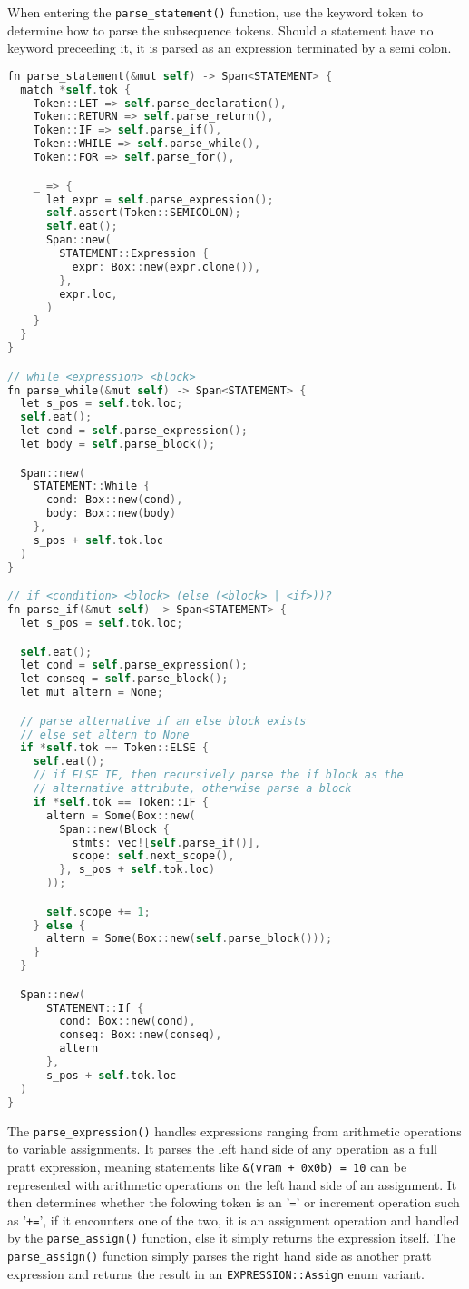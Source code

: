 When entering the \texttt{parse\_statement()} function, use the keyword token to determine how to parse the subsequence tokens. Should a statement have no keyword preceeding it, it is parsed as an expression terminated by a semi colon. 

\begin{lstlisting}[language=C]
fn parse_statement(&mut self) -> Span<STATEMENT> {
  match *self.tok {
    Token::LET => self.parse_declaration(),
    Token::RETURN => self.parse_return(),
    Token::IF => self.parse_if(),
    Token::WHILE => self.parse_while(),
    Token::FOR => self.parse_for(),

    _ => {
      let expr = self.parse_expression();
      self.assert(Token::SEMICOLON);
      self.eat();
      Span::new(
        STATEMENT::Expression {
          expr: Box::new(expr.clone()),
        },
        expr.loc,
      )
    }
  }
}

// while <expression> <block> 
fn parse_while(&mut self) -> Span<STATEMENT> {
  let s_pos = self.tok.loc;
  self.eat();
  let cond = self.parse_expression();
  let body = self.parse_block();

  Span::new(
    STATEMENT::While { 
      cond: Box::new(cond), 
      body: Box::new(body) 
    },
    s_pos + self.tok.loc
  )
}

// if <condition> <block> (else (<block> | <if>))?
fn parse_if(&mut self) -> Span<STATEMENT> {
  let s_pos = self.tok.loc;

  self.eat();
  let cond = self.parse_expression();
  let conseq = self.parse_block();
  let mut altern = None;

  // parse alternative if an else block exists
  // else set altern to None 
  if *self.tok == Token::ELSE {
    self.eat();
    // if ELSE IF, then recursively parse the if block as the 
    // alternative attribute, otherwise parse a block 
    if *self.tok == Token::IF {
      altern = Some(Box::new(
        Span::new(Block {
          stmts: vec![self.parse_if()],
          scope: self.next_scope(),
        }, s_pos + self.tok.loc)
      ));

      self.scope += 1;
    } else {
      altern = Some(Box::new(self.parse_block()));
    }
  }

  Span::new(
      STATEMENT::If { 
        cond: Box::new(cond), 
        conseq: Box::new(conseq), 
        altern 
      },
      s_pos + self.tok.loc
  )
}
\end{lstlisting}

The \texttt{parse\_expression()} handles expressions ranging from arithmetic operations to variable assignments. It parses the left hand side of any operation as a full pratt expression, meaning statements like \texttt{\&(vram + 0x0b) = 10} can be represented with arithmetic operations on the left hand side of an assignment. It then determines whether the folowing token is an '\texttt{=}' or increment operation such as '\texttt{+=}', if it encounters one of the two, it is an assignment operation and handled by the \texttt{parse\_assign()} function, else it simply returns the expression itself. The \texttt{parse\_assign()} function simply parses the right hand side as another pratt expression and returns the result in an \texttt{EXPRESSION::Assign} enum variant. 

